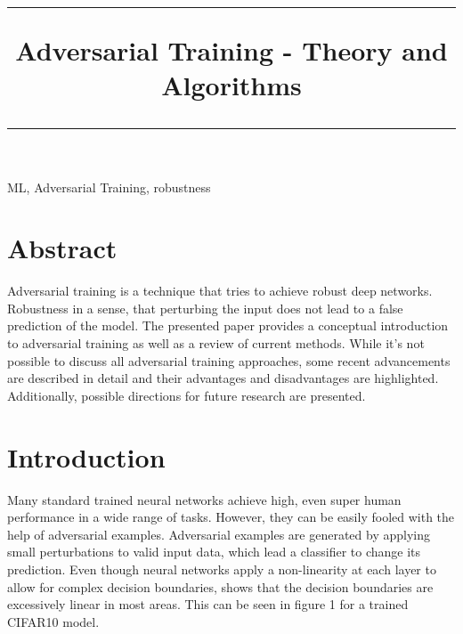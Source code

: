 \documentclass[conference]{IEEEtran}
\begin{document}
\title{\rule{\textwidth}{1pt} Adversarial Training - Theory and Algorithms
\vspace{-1cm} \rule[15pt]{\textwidth}{1pt}}

\author{
\vspace{-1cm}
}

\maketitle

\begin{IEEEkeywords}
  ML, Adversarial Training, robustness
\end{IEEEkeywords}

\section*{Abstract}
Adversarial training is a technique that tries to achieve robust deep networks. Robustness in a sense, that perturbing the input does not lead to a false prediction of the model. The presented paper provides a conceptual introduction to adversarial training as well as a review of current methods. While it's not possible to discuss all adversarial training approaches, some recent advancements are described in detail and their advantages and disadvantages are highlighted. Additionally, possible directions for future research are presented.

\section{Introduction}

Many standard trained neural networks achieve high, even super human performance in a wide range of tasks. However, they can be easily fooled with the help of adversarial examples. Adversarial examples are generated by applying small perturbations to valid input data, which lead a classifier to change its prediction. Even though neural networks apply a non-linearity at each layer to allow for complex decision boundaries, \cite{b27} shows that the decision boundaries are excessively linear in most areas. This can be seen in figure 1 for a trained CIFAR10 model. \\
\end{document}
